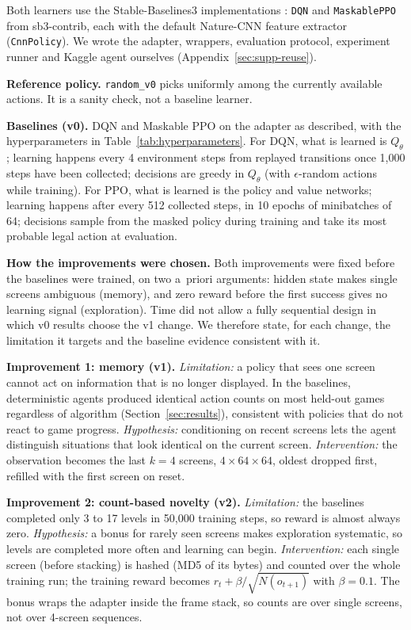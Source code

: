 \documentclass[10pt]{article}
\begin{document}
Both learners use the Stable-Baselines3 implementations \citep{raffin2021stable}: \texttt{DQN} and \texttt{MaskablePPO} from sb3-contrib, each with the default Nature-CNN feature extractor (\texttt{CnnPolicy}). We wrote the adapter, wrappers, evaluation protocol, experiment runner and Kaggle agent ourselves (Appendix~\ref{sec:supp-reuse}).

\textbf{Reference policy.} \texttt{random\_v0} picks uniformly among the currently available actions. It is a sanity check, not a baseline learner.

\textbf{Baselines (v0).} DQN and Maskable PPO on the adapter as described, with the hyperparameters in Table~\ref{tab:hyperparameters}.
For DQN, what is learned is $Q_\theta$; learning happens every 4 environment steps from replayed transitions once 1,000 steps have been collected; decisions are greedy in $Q_\theta$ (with $\epsilon$-random actions while training). For PPO, what is learned is the policy and value networks; learning happens after every 512 collected steps, in 10 epochs of minibatches of 64; decisions sample from the masked policy during training and take its most probable legal action at evaluation.

\textbf{How the improvements were chosen.} Both improvements were fixed before the baselines were trained, on two a~priori arguments: hidden state makes single screens ambiguous (memory), and zero reward before the first success gives no learning signal (exploration). Time did not allow a fully sequential design in which v0 results choose the v1 change. We therefore state, for each change, the limitation it targets and the baseline evidence consistent with it.

\textbf{Improvement 1: memory (v1).} \emph{Limitation:} a policy that sees one screen cannot act on information that is no longer displayed. In the baselines, deterministic agents produced identical action counts on most held-out games regardless of algorithm (Section~\ref{sec:results}), consistent with policies that do not react to game progress. \emph{Hypothesis:} conditioning on recent screens lets the agent distinguish situations that look identical on the current screen. \emph{Intervention:} the observation becomes the last $k=4$ screens, $4\times64\times64$, oldest dropped first, refilled with the first screen on reset.

\textbf{Improvement 2: count-based novelty (v2).} \emph{Limitation:} the baselines completed only 3 to 17 levels in 50,000 training steps, so reward is almost always zero. \emph{Hypothesis:} a bonus for rarely seen screens makes exploration systematic, so levels are completed more often and learning can begin. \emph{Intervention:} each single screen (before stacking) is hashed (MD5 of its bytes) and counted over the whole training run; the training reward becomes $r_t + \beta / \sqrt{N(o_{t+1})}$ with $\beta = 0.1$. The bonus wraps the adapter inside the frame stack, so counts are over single screens, not over 4-screen sequences.
\end{document}
